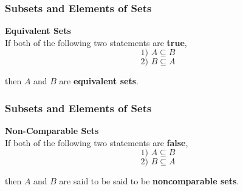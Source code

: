 \documentclass{beamer}
\begin{document}
\begin{frame}
\frametitle{Subsets and Elements of Sets}
\Large
\vspace{-2cm}
\textbf{Equivalent Sets}\\
If both of the following two statements are \textbf{true}, 
\[\mbox{1)  } A \subseteq B \]
\[\mbox{2)  } B \subseteq A \]

then $A$ and $B$ are \textbf{equivalent sets}.


\end{frame}


\begin{frame}
\frametitle{Subsets and Elements of Sets}
\Large
\vspace{-2cm}
\textbf{Non-Comparable Sets}\\
If both of the following two statements are \textbf{false}, 
\[\mbox{1)  } A \subseteq B \]
\[\mbox{2)  } B \subseteq A \]

then $A$ and $B$ are said to be said to be \textbf{noncomparable sets}.


\end{frame}

\end{document}
